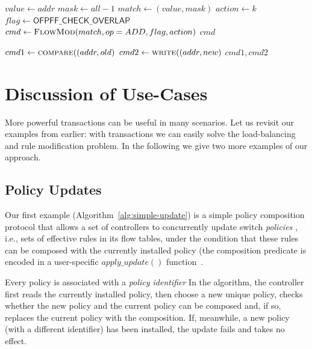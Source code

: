 \documentclass[conference]{sigcomm-alternate}
\newcommand{\concat}[0]{\oplus}
\newcommand{\cas}{CAS\xspace}
\newcommand{\compare}{compare\xspace}
\newcommand{\memwrite}{write\xspace}
\begin{document}
\begin{algorithm}[h]
    \caption{$\textit{\compare}(addr,k)$}
    \label{alg:compare}
    \begin{algorithmic}[1]
    		\State $value \gets addr$
    		\State $mask \gets  all-1$
    		\State $match \gets (value,mask)$
    		\State $action \gets k$
    		\State $flag \gets \textsf{OFPFF\_CHECK\_OVERLAP}$
    		\State $cmd\gets \textsc{FlowMod}(match, op = ADD, flag, action) $
			\Return $cmd$
    \end{algorithmic}
\end{algorithm}



\begin{algorithm}[h]
    \caption{$\textit{\cas}(addr, old,new)$}
    \label{alg:cas}
    \begin{algorithmic}[1]

    		\State $cmd1\gets \textsc{\compare}((addr, old) $
    		\State $cmd2\gets \textsc{\memwrite}((addr, new) $
			\Return $cmd1,cmd2$
    \end{algorithmic}
\end{algorithm}



\section{Discussion of Use-Cases}\label{sec:apps}

More powerful transactions can be useful in many scenarios.
Let us revisit our examples from earlier: with
transactions we can easily solve the load-balancing
and rule modification problem.
In the following we give two more examples of our approach.

\subsection{Policy Updates}

Our first example (Algorithm~\ref{alg:simple-update}) is a simple policy composition protocol that
allows a set of  controllers to concurrently update switch  \emph{policies} , i.e., sets of
effective rules in its flow tables, under the
condition that these rules can be composed with the currently installed
policy (the composition predicate is encoded in a user-specific
$\textit{apply\_update}()$ function~\cite{cpc}.

Every policy is associated with a \emph{policy identifier}
In the algorithm, the controller first reads the currently installed
policy, then choose a new unique policy, checks whether the new
policy and the current policy can be composed and, if so, replaces the
current policy with the composition. If, meanwhile, a new
policy (with a different identifier) has been installed, the update
fails and takes no effect.
\end{document}
